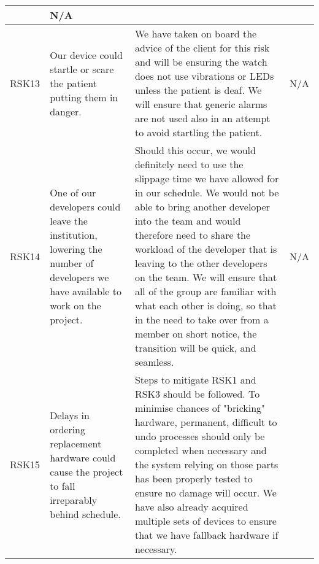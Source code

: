 \begin{xltabular}[H]{1.5\textwidth}{c | X | X | X}
    &
    
    N/A\\

    \midrule

    RSK13

    &

    Our device could startle or scare the patient putting them in danger.

    &

    We have taken on board the advice of the client for this risk and will be ensuring the watch does not use vibrations or LEDs unless the patient is deaf. We will ensure that generic alarms are not used also in an attempt to avoid startling the patient.
    
    &
    
    N/A\\

    \midrule

    RSK14

    &

    One of our developers could leave the institution, lowering the number of developers we have available to work on the project.

    &

    Should this occur, we would definitely need to use the slippage time we have allowed for in our schedule. We would not be able to bring another developer into the team and would therefore need to share the workload of the developer that is leaving to the other developers on the team. We will ensure that all of the group are familiar with what each other is doing, so that in the need to take over from a member on short notice, the transition will be quick, and seamless.
    
    &
    
    N/A\\
    
    \midrule

    RSK15

    &

    Delays in ordering replacement hardware could cause the project to fall irreparably behind schedule.

    &

    Steps to mitigate RSK1 and RSK3 should be followed. To minimise chances of "bricking" hardware, permanent, difficult to undo processes should only be completed when necessary and the system relying on those parts has been properly tested to ensure no damage will occur. We have also already acquired multiple sets of devices to ensure that we have fallback hardware if necessary.
    

\end{xltabular}
